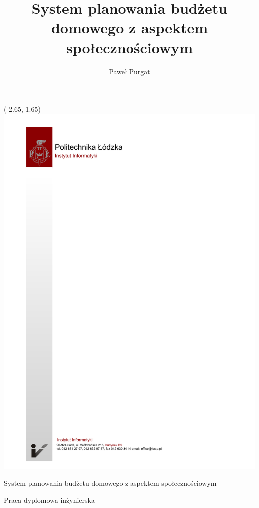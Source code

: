 \documentclass[a4paper,onecolumn,twoside,12pt]{mwrep}
\begin{document}
\lstset{
	showstringspaces=false,	
	basicstyle=\footnotesize\ttfamily,
}
\setcounter{page}{1}
\pagestyle{plain}


\author{Paweł Purgat}
\title{System planowania budżetu domowego z aspektem społecznościowym}
\begin{titlepage}
	\thispagestyle{empty}
	\begin{textblock}{1}(-2.65,-1.65)
		\includegraphics{img/tytulowa_pusta_mgrinz.pdf}
	\end{textblock}
	\vspace{7.3cm}
	\begin{center}
		\selectfont
		\Huge
		System planowania budżetu domowego z aspektem społecznościowym
	\end{center}
	\begin{center}
		\selectfont
		Praca dyplomowa inżynierska
	\end{center}

\end{titlepage}
\end{document}
